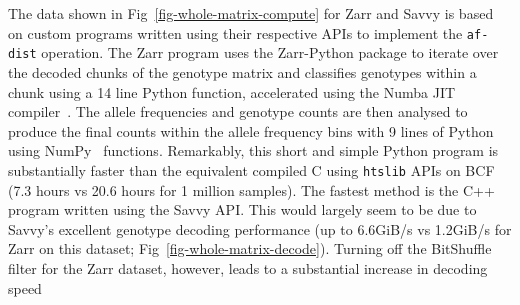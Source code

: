 \documentclass[a4paper,num-refs]{oup-contemporary}
\begin{document}
The data shown in Fig~\ref{fig-whole-matrix-compute} for Zarr and Savvy
is based on custom programs written using their respective APIs
to implement the \texttt{af-dist} operation. The Zarr program uses
the Zarr-Python package to iterate over the decoded chunks of the 
genotype matrix and classifies genotypes within a chunk using a 14 line Python
function, accelerated using the Numba JIT compiler~\cite{lam2015numba}.
The allele frequencies and genotype counts are then analysed to produce 
the final counts within the allele frequency bins with 9 lines of 
Python using NumPy~\cite{harris2020array} functions. Remarkably, this 
short and simple Python program is substantially faster than the 
equivalent compiled C using \texttt{htslib} APIs on BCF (7.3 hours
vs 20.6 hours for 1 million samples). 
The fastest method is the 
C++ program written using the Savvy API. This would largely seem
to be due to Savvy's excellent genotype decoding performance
(up to 6.6GiB/s vs 1.2GiB/s for Zarr on this dataset;
Fig~\ref{fig-whole-matrix-decode}).
Turning off the BitShuffle filter for the Zarr dataset,
however, leads to a substantial increase in decoding speed
\end{document}
